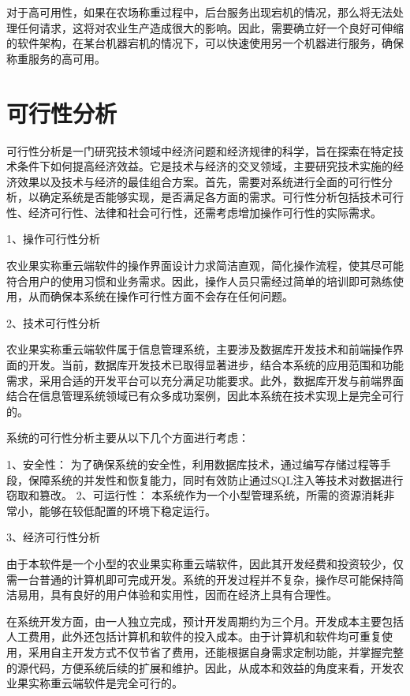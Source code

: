 对于高可用性，如果在农场称重过程中，后台服务出现宕机的情况，那么将无法处理任何请求，这将对农业生产造成很大的影响。因此，需要确立好一个良好可伸缩的软件架构，在某台机器宕机的情况下，可以快速使用另一个机器进行服务，确保称重服务的高可用。

\section{可行性分析}

可行性分析是一门研究技术领域中经济问题和经济规律的科学，旨在探索在特定技术条件下如何提高经济效益。它是技术与经济的交叉领域，主要研究技术实施的经济效果以及技术与经济的最佳组合方案。首先，需要对系统进行全面的可行性分析，以确定系统是否能够实现，是否满足各方面的需求。可行性分析包括技术可行性、经济可行性、法律和社会可行性，还需考虑增加操作可行性的实际需求。

1、操作可行性分析

农业果实称重云端软件的操作界面设计力求简洁直观，简化操作流程，使其尽可能符合用户的使用习惯和业务需求。因此，操作人员只需经过简单的培训即可熟练使用，从而确保本系统在操作可行性方面不会存在任何问题。

2、技术可行性分析

农业果实称重云端软件属于信息管理系统，主要涉及数据库开发技术和前端操作界面的开发。当前，数据库开发技术已取得显著进步，结合本系统的应用范围和功能需求，采用合适的开发平台可以充分满足功能要求。此外，数据库开发与前端界面结合在信息管理系统领域已有众多成功案例，因此本系统在技术实现上是完全可行的。

系统的可行性分析主要从以下几个方面进行考虑：
	
1、安全性：
    为了确保系统的安全性，利用数据库技术，通过编写存储过程等手段，保障系统的并发性和恢复能力，同时有效防止通过SQL注入等技术对数据进行窃取和篡改。
2、可运行性：
    本系统作为一个小型管理系统，所需的资源消耗非常小，能够在较低配置的环境下稳定运行。

3、经济可行性分析

由于本软件是一个小型的农业果实称重云端软件，因此其开发经费和投资较少，仅需一台普通的计算机即可完成开发。系统的开发过程并不复杂，操作尽可能保持简洁易用，具有良好的用户体验和实用性，因而在经济上具有合理性。

在系统开发方面，由一人独立完成，预计开发周期约为三个月。开发成本主要包括人工费用，此外还包括计算机和软件的投入成本。由于计算机和软件均可重复使用，采用自主开发方式不仅节省了费用，还能根据自身需求定制功能，并掌握完整的源代码，方便系统后续的扩展和维护。因此，从成本和效益的角度来看，开发农业果实称重云端软件是完全可行的。

